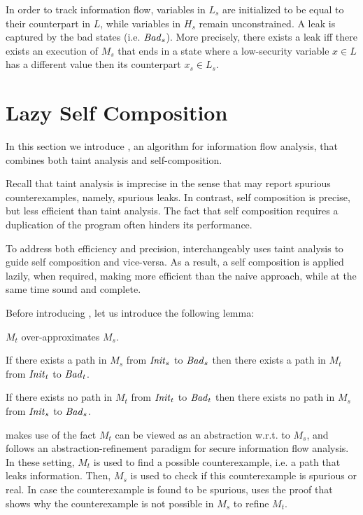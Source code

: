 In order to track information flow, variables in $L_s$  are initialized to be equal to their counterpart in $L$, while variables in $H_s$ remain unconstrained. A leak is captured by the bad states (i.e. $\mathit{Bad}_s$). More precisely, there exists a leak iff there exists an execution of $M_s$ that ends in a state where a low-security variable $x\in L$ has a different value then its counterpart $x_s\in L_s$.



\section{Lazy Self Composition}

In this section we introduce \Ifc, an algorithm for information flow analysis, that combines both taint analysis and self-composition. 

Recall that taint analysis is imprecise in the sense that may report spurious counterexamples, namely, spurious leaks. In contrast, self composition is precise, but less efficient than taint analysis. The fact that self composition requires a duplication of the program often hinders its performance.

To address both efficiency and precision, \Ifc interchangeably uses taint analysis to guide self composition and vice-versa. As a result, a self composition is applied lazily, when required, making \Ifc more efficient than the naive approach, while at the same time sound and complete.

Before introducing \Ifc, let us introduce the following lemma:

\begin{lemma}
$M_t$ over-approximates $M_s$.
\end{lemma}

\begin{corollary}
If there exists a path in $M_s$ from $\mathit{Init}_s$ to $\mathit{Bad}_s$ then there exists a path in $M_t$ from $\mathit{Init}_t$ to $\mathit{Bad}_t$.
\end{corollary}

\begin{corollary}
If there exists no path in $M_t$ from $\mathit{Init}_t$ to $\mathit{Bad}_t$ then there exists no path in $M_s$ from $\mathit{Init}_s$ to $\mathit{Bad}_s$.
\end{corollary}

\Ifc makes use of the fact $M_t$ can be viewed as an abstraction w.r.t. to $M_s$, and follows an abstraction-refinement paradigm for secure information flow analysis. In these setting, $M_t$ is used to find a possible counterexample, i.e. a path that leaks information. Then, $M_s$ is used to check if this counterexample is spurious or real. In case the counterexample is found to be spurious, \Ifc uses the proof that shows why the counterexample is not possible in $M_s$ to refine $M_t$.

